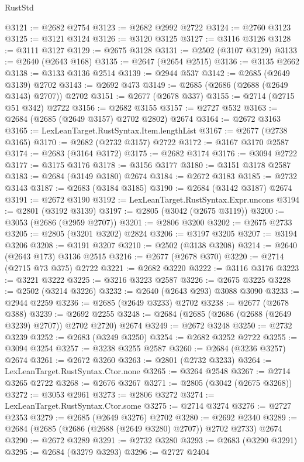 \begin{lexlean}{RustStd}
\begin{coremodule}
@3121 := @2682 @2754
@3123 := @2682 @2992 @2722
@3124 := @2760 @3123
@3125 := @3121 @3124
@3126 := @3120 @3125
@3127 := @3116 @3126
@3128 := @3111 @3127
@3129 := @2675 @3128
@3131 := @2502 (@3107 @3129)
@3133 := @2640 (@2643 @168)
@3135 := @2647 (@2654 @2515)
@3136 := @3135 @2662
@3138 := @3133 @3136 @2514
@3139 := @2944 @537
@3142 := @2685 (@2649 @3139) @2702
@3143 := @2692 @473
@3149 := @2685 (@2686 (@2688 (@2649 @3143) @2707)) @2702
@3151 := @2677 (@2678 @337)
@3155 := @2714 (@2715 @51 @342) @2722
@3156 := @2682 @3155
@3157 := @2727 @532
@3163 := @2684 (@2685 (@2649 @3157) @2702 @2802) @2674
@3164 := @2672 @3163
@3165 := LexLeanTarget.RustSyntax.Item.lengthList
@3167 := @2677 (@2738 @3165)
@3170 := @2682 (@2732 @3157) @2722
@3172 := @3167 @3170 @2587
@3174 := @2683 (@3164 @3172)
@3175 := @2682 @3174
@3176 := @3094 @2722
@3177 := @3175 @3176
@3178 := @3156 @3177
@3180 := @3151 @3178 @2587
@3183 := @2684 (@3149 @3180) @2674
@3184 := @2672 @3183
@3185 := @2732 @3143
@3187 := @2683 (@3184 @3185)
@3190 := @2684 (@3142 @3187) @2674
@3191 := @2672 @3190
@3192 := LexLeanTarget.RustSyntax.Expr.uncons
@3194 := @2801 (@3192 @3139)
@3197 := @2805 (@3042 (@2675 @3119))
@3200 := @3053 (@2686 (@2959 @2707))
@3201 := @2806 @3200
@3202 := @2675 @2733
@3205 := @2805 (@3201 @3202) @2824
@3206 := @3197 @3205
@3207 := @3194 @3206
@3208 := @3191 @3207
@3210 := @2502 (@3138 @3208)
@3214 := @2640 (@2643 @173) @3136 @2515
@3216 := @2677 (@2678 @370)
@3220 := @2714 (@2715 @73 @375) @2722
@3221 := @2682 @3220
@3222 := @3116 @3176
@3223 := @3221 @3222
@3225 := @3216 @3223 @2587
@3226 := @2675 @3225
@3228 := @2502 (@3214 @3226)
@3232 := @2640 (@2643 @293) @3088 @3090
@3233 := @2944 @2259
@3236 := @2685 (@2649 @3233) @2702
@3238 := @2677 (@2678 @388)
@3239 := @2692 @2255
@3248 := @2684 (@2685 (@2686 (@2688 (@2649 @3239) @2707)) @2702 @2720) @2674
@3249 := @2672 @3248
@3250 := @2732 @3239
@3252 := @2683 (@3249 @3250)
@3254 := @2682 @3252 @2722
@3255 := @3094 @3254
@3257 := @3238 @3255 @2587
@3260 := @2684 (@3236 @3257) @2674
@3261 := @2672 @3260
@3263 := @2801 (@2732 @3233)
@3264 := LexLeanTarget.RustSyntax.Ctor.none
@3265 := @3264 @2548
@3267 := @2714 @3265 @2722
@3268 := @2676 @3267
@3271 := @2805 (@3042 (@2675 @3268))
@3272 := @3053 @2961
@3273 := @2806 @3272
@3274 := LexLeanTarget.RustSyntax.Ctor.some
@3275 := @2714 @3274
@3276 := @2727 @2353
@3279 := @2685 (@2649 @3276) @2702
@3280 := @2692 @2340
@3289 := @2684 (@2685 (@2686 (@2688 (@2649 @3280) @2707)) @2702 @2733) @2674
@3290 := @2672 @3289
@3291 := @2732 @3280
@3293 := @2683 (@3290 @3291)
@3295 := @2684 (@3279 @3293)
@3296 := @2727 @2404

\end{coremodule}
\end{lexlean}

